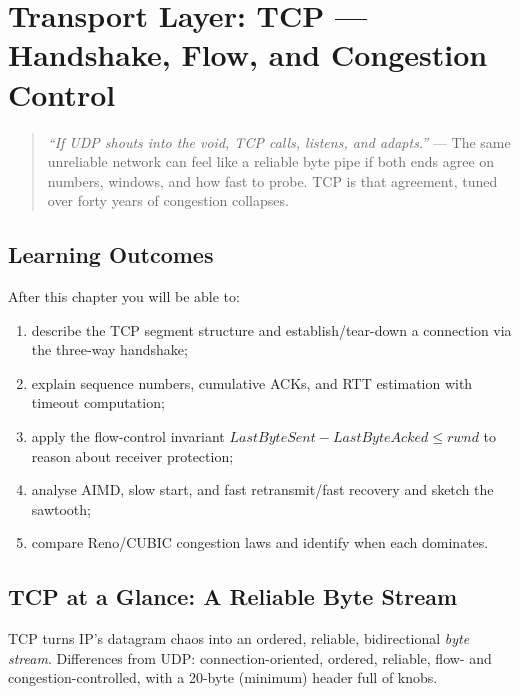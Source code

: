 \chapter{Transport Layer: TCP --- Handshake, Flow, and Congestion Control}
\label{ch:transport-tcp}

\begin{quote}
\emph{``If UDP shouts into the void, TCP calls, listens, and adapts.''} --- The same unreliable network can feel like a reliable byte pipe if both ends agree on numbers, windows, and how fast to probe. TCP is that agreement, tuned over forty years of congestion collapses.
\end{quote}

\noindent{}
\vspace{0.4em}

\section*{Learning Outcomes}
After this chapter you will be able to:
\begin{enumerate}[label=(L\arabic*)]
    \item describe the TCP segment structure and establish/tear-down a connection via the three-way handshake;
    \item explain sequence numbers, cumulative ACKs, and RTT estimation with timeout computation;
    \item apply the flow-control invariant $LastByteSent - LastByteAcked \le rwnd$ to reason about receiver protection;
    \item analyse AIMD, slow start, and fast retransmit/fast recovery and sketch the sawtooth;
    \item compare Reno/CUBIC congestion laws and identify when each dominates.
\end{enumerate}

\section{TCP at a Glance: A Reliable Byte Stream}
\label{sec:tcp-overview}
TCP turns IP's datagram chaos into an ordered, reliable, bidirectional \emph{byte stream}. Differences from UDP: connection-oriented, ordered, reliable, flow- and congestion-controlled, with a 20-byte (minimum) header full of knobs.

